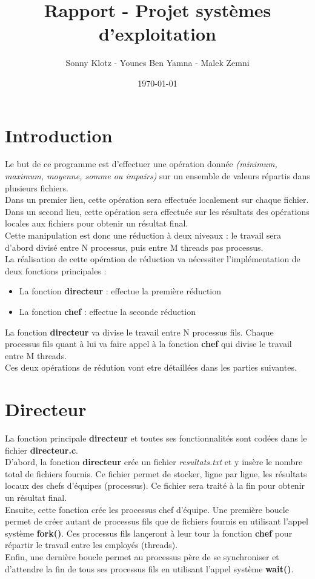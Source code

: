 \documentclass[a4]{article}
\author{Sonny Klotz - Younes Ben Yamna - Malek Zemni}
\title{Rapport - Projet systèmes d'exploitation}
\date{\today}
\begin{document}
\maketitle

	\section{Introduction}
			Le but de ce programme est d'effectuer une opération donnée \textit{(minimum, maximum, moyenne, somme ou impairs)} sur
			un ensemble de valeurs répartis dans plusieurs fichiers.\\
			Dans un premier lieu, cette opération sera effectuée localement sur chaque fichier. Dans un second lieu, cette opération sera effectuée
			sur les résultats des opérations locales aux fichiers pour obtenir un résultat final.\\
			Cette manipulation est donc une réduction à deux niveaux : le travail sera d'abord divisé entre N processus, puis entre M 
			threads pas processus.\\
			La réalisation de cette opération de réduction va nécessiter l'implémentation de deux fonctions principales :
			\begin{itemize}
				\item{La fonction \textbf{directeur} : effectue la première réduction}
				\item{La fonction \textbf{chef} : effectue la seconde réduction}
			\end{itemize}
			La fonction \textbf{directeur} va divise le travail entre N processus fils. Chaque processus fils quant à lui va faire appel à la fonction 
			\textbf{chef} qui divise le travail entre M threads.\\
			Ces deux opérations de rédution vont etre détaillées dans les parties suivantes.
			
	\section{Directeur}
			La fonction principale \textbf{directeur} et toutes ses fonctionnalités sont codées dans le fichier \textbf{directeur.c}.\\
			
			D'abord, la fonction \textbf{directeur} crée un fichier \textit{resultats.txt} et y insère le nombre total de fichiers fournis. Ce 
			fichier permet de stocker, ligne par ligne, les résultats locaux des chefs d'équipes (processus). Ce fichier sera traité à la fin pour 
			obtenir un résultat final.\\
			Ensuite, cette fonction crée les processus chef d'équipe. Une première boucle permet de créer autant de processus fils que de fichiers 
			fournis en utilisant l'appel système \textbf{fork()}. Ces processus fils lançeront à leur tour la fonction \textbf{chef} pour répartir 
			le travail entre les employés (threads).\\
			Enfin, une dernière boucle permet au processus père de se synchroniser et d'attendre la fin de tous ses processus fils en utilisant 
			l'appel système \textbf{wait()}.
			
\end{document}
